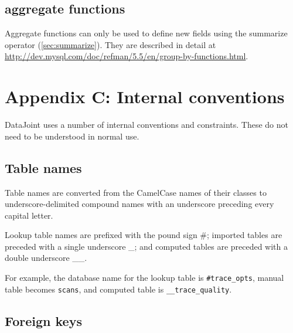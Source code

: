 \documentclass[10pt]{article}
\begin{document}
\subsection{aggregate functions}
Aggregate functions can only be used to define new fields using the summarize operator (\autoref{sec:summarize}).  They are described in detail at \url{http://dev.mysql.com/doc/refman/5.5/en/group-by-functions.html}.

\section{Appendix C: Internal conventions}
DataJoint uses a number of internal conventions and constraints. These do not need to be understood in normal use.

\subsection{Table names}
Table names are converted from the CamelCase names of their classes to underscore-delimited compound names with an underscore preceding every capital letter.

Lookup table names are prefixed with the pound sign \#; imported tables are preceded with a single underscore \_; and computed tables are preceded with a double underscore \_\_. 

For example, the database name for the lookup table  is {\tt \#trace\_opts}, manual table  becomes {\tt scans}, and computed table  is {\tt \_\_trace\_quality}.

\subsection{Foreign keys}
\end{document}
